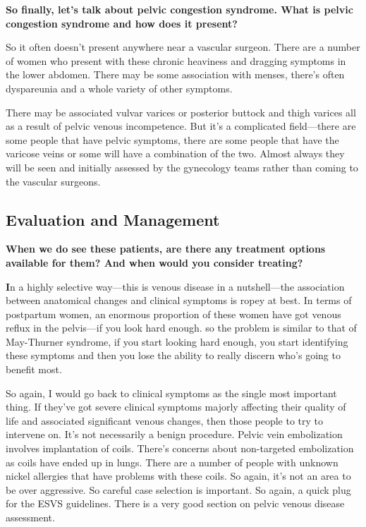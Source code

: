 \documentclass[
]{book}
\begin{document}
\textbf{So finally, let's talk about pelvic congestion syndrome. What is
pelvic congestion syndrome and how does it present?}

So it often doesn't present anywhere near a vascular surgeon. There are
a number of women who present with these chronic heaviness and dragging
symptoms in the lower abdomen. There may be some association with
menses, there's often dyspareunia and a whole variety of other symptoms.

There may be associated vulvar varices or posterior buttock and thigh
varices all as a result of pelvic venous incompetence. But it's a
complicated field---there are some people that have pelvic symptoms,
there are some people that have the varicose veins or some will have a
combination of the two. Almost always they will be seen and initially
assessed by the gynecology teams rather than coming to the vascular
surgeons.

\hypertarget{evaluation-and-management}{%
\subsection{Evaluation and Management}\label{evaluation-and-management}}

\textbf{When we do see these patients, are there any treatment options
available for them? And when would you consider treating?}

\textbf{I}n a highly selective way---this is venous disease in a
nutshell---the association between anatomical changes and clinical
symptoms is ropey at best. In terms of postpartum women, an enormous
proportion of these women have got venous reflux in the pelvis---if you
look hard enough. so the problem is similar to that of May-Thurner
syndrome, if you start looking hard enough, you start identifying these
symptoms and then you lose the ability to really discern who's going to
benefit most.

So again, I would go back to clinical symptoms as the single most
important thing. If they've got severe clinical symptoms majorly
affecting their quality of life and associated significant venous
changes, then those people to try to intervene on. It's not necessarily
a benign procedure. Pelvic vein embolization involves implantation of
coils. There's concerns about non-targeted embolization as coils have
ended up in lungs. There are a number of people with unknown nickel
allergies that have problems with these coils. So again, it's not an
area to be over aggressive. So careful case selection is important. So
again, a quick plug for the ESVS guidelines. There is a very good
section on pelvic venous disease assessment.\citep{demaeseneer2022}
\end{document}
